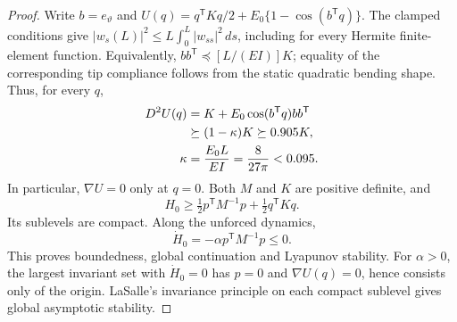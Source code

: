 \begin{proof}
Write $b=e_\vartheta$ and
$U(q)=q^{\mathsf T}Kq/2+E_0\{1-\cos(b^{\mathsf T}q)\}$.
The clamped conditions give
$|w_s(L)|^2\leq L\int_0^L|w_{ss}|^2\,ds$, including for every
Hermite finite-element function. Equivalently,
$bb^{\mathsf T}\preceq [L/(EI)]K$; equality of the corresponding
tip compliance follows from the static quadratic bending shape.
Thus, for every $q$,
\begin{align}
 D^2U(q)&=K+E_0\cos(b^{\mathsf T}q)bb^{\mathsf T}\notag\\
 &\succeq(1-\kappa)K\succeq0.905K,\\
 \kappa&=\frac{E_0L}{EI}=\frac8{27\pi}<0.095.
\end{align}
In particular, $\nabla U=0$ only at $q=0$.
Both $M$ and $K$ are positive definite, and
\[
 H_0\geq\tfrac12p^{\mathsf T}M^{-1}p+\tfrac12q^{\mathsf T}Kq.
\]
Its sublevels are compact. Along the unforced dynamics,
\[
 \dot H_0=-\alpha p^{\mathsf T}M^{-1}p\leq0.
\]
This proves boundedness, global continuation and Lyapunov stability.
For $\alpha>0$, the largest invariant set with $\dot H_0=0$ has
$p=0$ and $\nabla U(q)=0$, hence consists only of the origin.
LaSalle's invariance principle on each compact sublevel gives global
asymptotic stability.
\end{proof}
